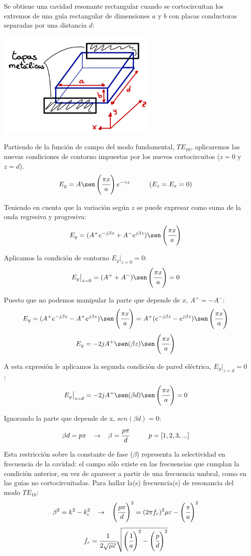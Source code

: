 \documentclass[12pt]{article}
\begin{document}
Se obtiene una cavidad resonante rectangular cuando se cortocircuitan los extremos de una gu\'ia rectangular de dimensiones $a$ y $b$ con placas conductoras separadas por una distancia $d$:
\begin{center}
	\includegraphics[width=8cm]{img/Cavidad_rectangular.jpg}
\end{center}

Partiendo de la funci\'on de campo del modo fundamental, $TE_{10}$, aplicaremos las nuevas condiciones de contorno impuestas por los nuevos cortocircuitos ($z = 0$ y $z = d$).
$$E_y = A\sen\left(\cfrac{\pi x}{a}\right) e^{-\gamma z} \hspace{1cm} (E_z = E_x =0)$$

Teniendo en cuenta que la variaci\'on seg\'un $z$ se puede expresar como suma de la onda regresiva y progresiva:
$$E_y = (A^+ e^{-j\beta z} + A^- e^{j\beta z})\sen\left(\cfrac{\pi x}{a}\right)$$

Aplicamos la condici\'on de contorno $E_y\big|_{z=0} = 0$:
$$E_y\big|_{z=0} = (A^+ + A^-)\sen\left(\cfrac{\pi x}{a}\right) = 0$$

Puesto que no podemos manipular la parte que depende de $x$, $A^+ = -A^-$:
$$E_y = (A^+ e^{-j\beta z} - A^+ e^{j\beta z})\sen\left(\cfrac{\pi x}{a}\right) = A^+ (e^{-j\beta z} - e^{j\beta z})\sen\left(\cfrac{\pi x}{a}\right)$$
$$E_y = -2jA^+ \sen(\beta z) \sen\left(\cfrac{\pi x}{a}\right)$$

A esta expresi\'on le aplicamos la segunda condici\'on de pared el\'ectrica, $E_y\big|_{z=d} = 0$:
$$E_y\big|_{z=d} = -2jA^+ \sen(\beta d) \sen\left(\cfrac{\pi x}{a}\right) = 0$$

Ignorando la parte que depende de x, $sen(\beta d) = 0$:
$$\beta d = p\pi \hspace{0.3cm} \rightarrow \hspace{0.3cm} \beta = \cfrac{p\pi}{d} \hspace{1cm} p = [1,2,3,...]$$

Esta restricci\'on sobre la constante de fase ($\beta$) representa la selectividad en frecuencia de la cavidad: el campo s\'olo existe en las frecuencias que cumplan la condici\'on anterior, en vez de aparecer a partir de una frecuencia umbral, como en las gu\'ias no cortocircuitadas. Para hallar la(s) frecuencia(s) de resonancia del modo $TE_{10}$:
$$\beta^2 = k^2 - k_c^2 \hspace{0.3cm} \rightarrow \hspace{0.3cm} \left(\cfrac{p\pi}{d}\right)^2 = (2\pi f_r)^2 \mu\varepsilon -\left(\cfrac{\pi}{a}\right)^2$$
$$f_r = \cfrac{1}{2\sqrt{\mu\varepsilon}}\sqrt{\left(\cfrac{1}{a}\right)^2 - \left(\cfrac{p}{d}\right)^2}$$
\end{document}
